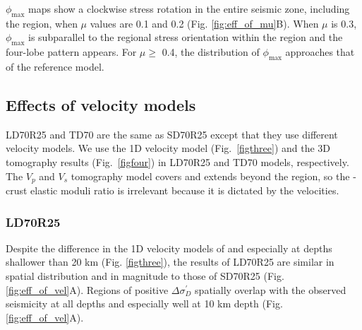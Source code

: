 \documentclass[draft]{agujournal2018}
\begin{document}
$\phi_{\max}$ maps show a clockwise stress rotation in the entire seismic zone, including the  region, when $\mu$ values are 0.1 and 0.2 (Fig. \ref{fig:eff_of_mu}B). When $\mu$ is 0.3, $\phi_{\max}$ is subparallel to the regional stress orientation within the  region and the four-lobe pattern appears. For $\mu \ge$ 0.4, the distribution of $\phi_{\max}$ approaches that of the reference model.


\subsection{Effects of velocity models}
LD70R25 and TD70 are the same as SD70R25 except that they use different velocity models. We use the 1D velocity model \citep{lamontagne1999} (Fig.~\ref{figthree}) and the 3D tomography results \citep{Powell_2017} (Fig.~\ref{figfour}) in LD70R25 and TD70 models, respectively. The $V_p$ and $V_s$ tomography model covers and extends beyond the  region, so the -crust elastic moduli ratio is irrelevant because it is dictated by the velocities.

\subsubsection{LD70R25}
Despite the difference in the 1D velocity models of \citet{lamontagne1999} and \citet{Somerville1990} especially at depths shallower than 20 km (Fig. \ref{figthree}), the results of LD70R25 are similar in spatial distribution and in magnitude to those of SD70R25 (Fig. \ref{fig:eff_of_vel}A). Regions of positive $\Delta\sigma_{D}^{\prime}$ spatially overlap with the observed seismicity at all depths and especially well at 10 km depth (Fig. \ref{fig:eff_of_vel}A).  
\end{document}
